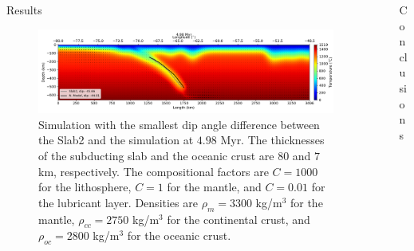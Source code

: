 \documentclass[final]{beamer}
\newlength{\sepwidth}
\newlength{\colwidth}
\newcommand{\separatorcolumn}{\begin{column}{\sepwidth}\end{column}}
\begin{document}
\begin{frame}[t]
\begin{columns}[t]
\begin{column}{\colwidth}
\begin{block}{Results}
  \begin{figure}
    \centering
    \includegraphics[width=0.22\paperwidth]{figures/angle-step_204.png}
    \caption{Simulation with the smallest dip angle difference between the Slab2 and the simulation at $4.98$ Myr. The thicknesses of the subducting slab and the oceanic crust are $80$ and $7$ km, respectively. The compositional factors are $C = 1000$ for the lithosphere, $C=1$ for the mantle, and $C=0.01$ for the lubricant layer. Densities are $\rho_m=3300$ kg/m$^3$ for the mantle, $\rho_{cc}=2750$ kg/m$^3$ for the continental crust, and $\rho_{oc}=2800$ kg/m$^3$ for the oceanic crust.}
    \label{fig:result4}
  \end{figure}

  \end{block}

 \end{column}

\separatorcolumn

\begin{column}{\colwidth}

  \begin{block}{Conclusions}


\end{block}
\end{column}
\end{columns}
\end{frame}
\end{document}
